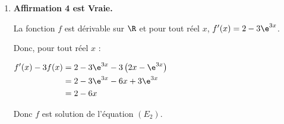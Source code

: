 \begin{enumerate}
\begin{enumerate}
	Or $\lim\limits_{x\to +\infty} \dfrac{1}{x} =0 $ donc, par somme,  $\lim\limits_{x\to +\infty }1 -\dfrac{1}{x} =1 $ et  $\lim\limits_{x\to +\infty }1 +\dfrac{1}{x} =1 $. 
	
	D'après le théorème des gendarmes, on a donc : $\lim\limits_{x\to +\infty }f(x) =1 $. 
	
	C'est à dire, la droite d'équation $y=1$ est une asymptote horizontale à la courbe représentative de la fonction $f$ au voisinage de $+\infty$.
	\end{enumerate}



	\item 	\textbf{Affirmation 4  est Vraie.} 
	
	
	 La fonction $f$ est dérivable sur $\R$ et pour tout réel $x$, $f'(x) = 2 -3 \e^{3x}$.
	
	Donc, pour tout réel $x$ : 
	
	$\begin{aligned} f'(x) -3f(x) &=  2 -3 \e^{3x} - 3 \left(2x-\e^{3x}\right) \\
		 &= 2 -3 \e^{3x} - 6x +3 \e^{3x} \\
		 &= 2  - 6x 
		 \end{aligned}$ 
		 
		 Donc $f$ est solution de l'équation $(E_{2})$.
	
\end{enumerate}
